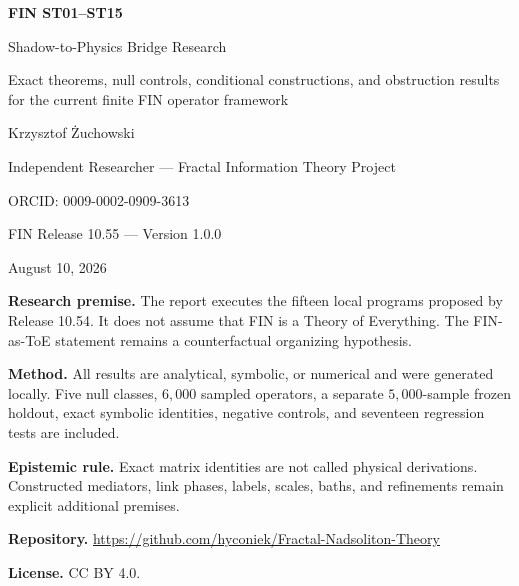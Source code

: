 \documentclass[11pt,a4paper]{article}
\begin{document}
\begin{titlepage}
\centering
\vspace*{1.55cm}
{\LARGE\bfseries FIN ST01--ST15\par}
\vspace{0.38cm}
{\Large Shadow-to-Physics Bridge Research\par}
\vspace{0.45cm}
{\large Exact theorems, null controls, conditional constructions, and obstruction results for the current finite FIN operator framework\par}
\vspace{1.25cm}
{\Large Krzysztof Żuchowski\par}
\vspace{0.24cm}
{\large Independent Researcher --- Fractal Information Theory Project\par}
{\large ORCID: 0009-0002-0909-3613\par}
\vspace{1.05cm}
{\large FIN Release 10.55 --- Version 1.0.0\par}
{\large August 10, 2026\par}
\vfill
\begin{minipage}{0.88\textwidth}
\textbf{Research premise.} The report executes the fifteen local programs proposed by Release 10.54. It does not assume that FIN is a Theory of Everything. The FIN-as-ToE statement remains a counterfactual organizing hypothesis.\par
\textbf{Method.} All results are analytical, symbolic, or numerical and were generated locally. Five null classes, $6{,}000$ sampled operators, a separate $5{,}000$-sample frozen holdout, exact symbolic identities, negative controls, and seventeen regression tests are included.\par
\textbf{Epistemic rule.} Exact matrix identities are not called physical derivations. Constructed mediators, link phases, labels, scales, baths, and refinements remain explicit additional premises.\par
\textbf{Repository.} \url{https://github.com/hyconiek/Fractal-Nadsoliton-Theory}\par
\textbf{License.} CC BY 4.0.
\end{minipage}
\end{titlepage}
\end{document}
